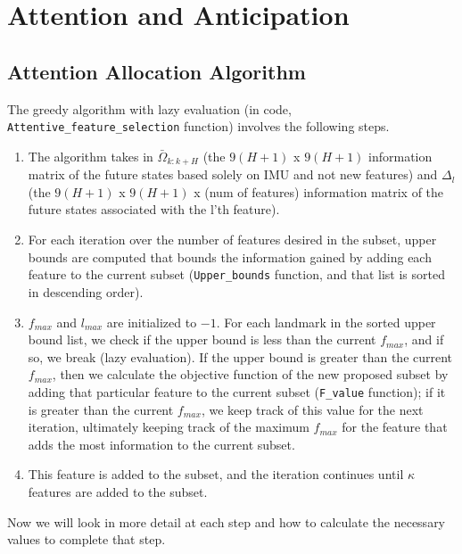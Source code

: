 
\section{Attention and Anticipation}\label{sec:anticipation}

\subsection{Attention Allocation Algorithm}\label{sub:attn_algo}

The greedy algorithm with lazy evaluation (in code, \texttt{Attentive\_feature\_selection} function) involves the following steps. 
\begin{enumerate}
    \item The algorithm takes in $\bar{\Omega}_{k:k+H}$ (the $9(H+1)$ x $9(H+1)$ information matrix of the future states based solely on IMU and not new features) and $\Delta_l$ (the $9(H+1)$ x $9(H+1)$ x (num of features) information matrix of the future states associated with the l'th feature).
    \item For each iteration over the number of features desired in the subset, upper bounds are computed that bounds the information gained by adding each feature to the current subset (\texttt{Upper\_bounds} function, and that list is sorted in descending order).
    \item $f_{max}$ and $l_{max}$ are initialized to $-1$. For each landmark in the sorted upper bound list, we check if the upper bound is less than the current $f_{max}$, and if so, we break (lazy evaluation). If the upper bound is greater than the current $f_{max}$, then we calculate the objective function of the new proposed subset by adding that particular feature to the current subset (\texttt{F\_value} function); if it is greater than the current $f_{max}$, we keep track of this value for the next iteration, ultimately keeping track of the maximum $f_{max}$ for the feature that adds the most information to the current subset.
    \item This feature is added to the subset, and the iteration continues until $\kappa$ features are added to the subset.
\end{enumerate}
Now we will look in more detail at each step and how to calculate the necessary values to complete that step.


